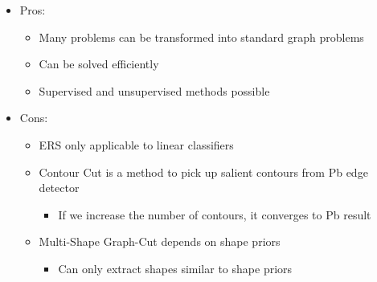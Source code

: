 \documentclass[11pt, a4paper, landscape]{article}
\begin{document}
\NewPage{}
\vfill
\begin{itemize}
	\item Pros:
	\begin{itemize}
		\item Many problems can be transformed into standard graph problems
		\item Can be solved efficiently
		\item Supervised and unsupervised methods possible
	\end{itemize}
	\vfill
	\item Cons:
	\begin{itemize}
		\item ERS only applicable to linear classifiers
		\item Contour Cut is a method to pick up salient contours from Pb edge detector
		\begin{itemize}
			\item If we increase the number of contours, it converges to Pb result
		\end{itemize}
		\item Multi-Shape Graph-Cut depends on shape priors
		\begin{itemize}
			\item Can only extract shapes similar to shape priors
		\end{itemize}
	\end{itemize}
\end{itemize}
\vfill




\FinalPage



\NewPage
\footnotesize


\end{document}
